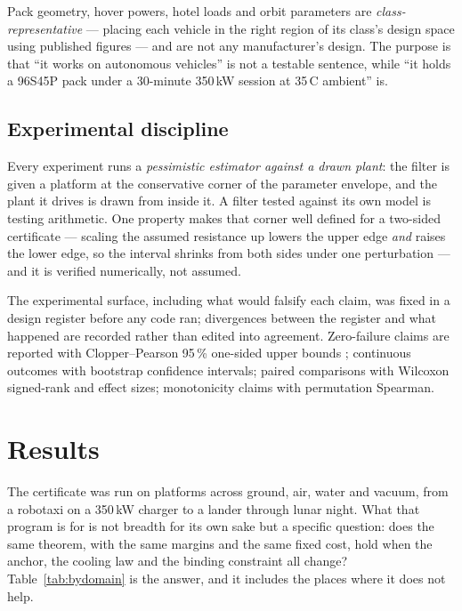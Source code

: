 \documentclass[11pt,letterpaper]{article}
\theoremstyle{definition}
\theoremstyle{remark}
\newcommand{\SI}[2]{#1\,#2}
\newcommand{\degreeCelsius}{\degC}
\newcommand{\degC}{\ifmmode{^\circ}\mathrm{C}\else\textdegree C\fi}
\begin{document}
Pack geometry, hover powers, hotel loads and orbit parameters are
\emph{class-representative} --- placing each vehicle in the right region of its class's design
space using published figures --- and are not any manufacturer's design. The purpose is that
``it works on autonomous vehicles'' is not a testable sentence, while ``it holds a 96S45P pack
under a 30-minute 350\,kW session at \SI{35}{\degreeCelsius} ambient'' is.

\subsection{Experimental discipline}

Every experiment runs a \emph{pessimistic estimator against a drawn plant}: the filter is given a
platform at the conservative corner of the parameter envelope, and the plant it drives is drawn
from inside it. A filter tested against its own model is testing arithmetic. One property makes
that corner well defined for a two-sided certificate --- scaling the assumed resistance up
lowers the upper edge \emph{and} raises the lower edge, so the interval shrinks from both sides
under one perturbation --- and it is verified numerically, not assumed.

The experimental surface, including what would falsify each claim, was fixed in a design
register before any code ran; divergences between the register and what happened are recorded
rather than edited into agreement. Zero-failure claims are reported with Clopper--Pearson 95\,\%
one-sided upper bounds \cite{clopper1934}; continuous outcomes with bootstrap confidence
intervals; paired comparisons with Wilcoxon signed-rank and effect sizes; monotonicity claims
with permutation Spearman.



\section{Results}\label{sec:domains}

The certificate was run on \vPlatforms{} platforms across ground, air, water and vacuum, from a
robotaxi on a 350\,kW charger to a lander through lunar night. What that program is for is not
breadth for its own sake but a specific question: does the same theorem, with the same margins
and the same fixed cost, hold when the anchor, the cooling law and the binding constraint all
change? Table~\ref{tab:bydomain} is the answer, and it includes the places where it does not
help.
\end{document}
